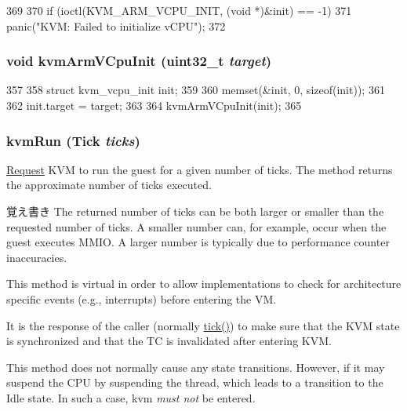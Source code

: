 \begin{DoxyCode}
369 {
370     if (ioctl(KVM_ARM_VCPU_INIT, (void *)&init) == -1)
371         panic("KVM: Failed to initialize vCPU\n");
372 }
\end{DoxyCode}
\hypertarget{classArmKvmCPU_a2b5088861eb66dc69fc8dc2f39f6174e}{
\subsubsection[{kvmArmVCpuInit}]{\setlength{\rightskip}{0pt plus 5cm}void kvmArmVCpuInit ({\bf uint32\_\-t} {\em target})}}
\label{classArmKvmCPU_a2b5088861eb66dc69fc8dc2f39f6174e}



\begin{DoxyCode}
357 {
358     struct kvm_vcpu_init init;
359 
360     memset(&init, 0, sizeof(init));
361 
362     init.target = target;
363 
364     kvmArmVCpuInit(init);
365 }
\end{DoxyCode}
\hypertarget{classArmKvmCPU_aed3dbd0c0bf26d82ee56367a3f350506}{
\subsubsection[{kvmRun}]{ kvmRun ({\bf Tick} {\em ticks})}}
\label{classArmKvmCPU_aed3dbd0c0bf26d82ee56367a3f350506}
\hyperlink{classRequest}{Request} KVM to run the guest for a given number of ticks. The method returns the approximate number of ticks executed.

\begin{DoxyNote}{覚え書き}
The returned number of ticks can be both larger or smaller than the requested number of ticks. A smaller number can, for example, occur when the guest executes MMIO. A larger number is typically due to performance counter inaccuracies.

This method is virtual in order to allow implementations to check for architecture specific events (e.g., interrupts) before entering the VM.

It is the response of the caller (normally \hyperlink{classBaseKvmCPU_a873dd91783f9efb4a590aded1f70d6b0}{tick()}) to make sure that the KVM state is synchronized and that the TC is invalidated after entering KVM.

This method does not normally cause any state transitions. However, if it may suspend the CPU by suspending the thread, which leads to a transition to the Idle state. In such a case, kvm {\itshape must not\/} be entered.
\end{DoxyNote}

